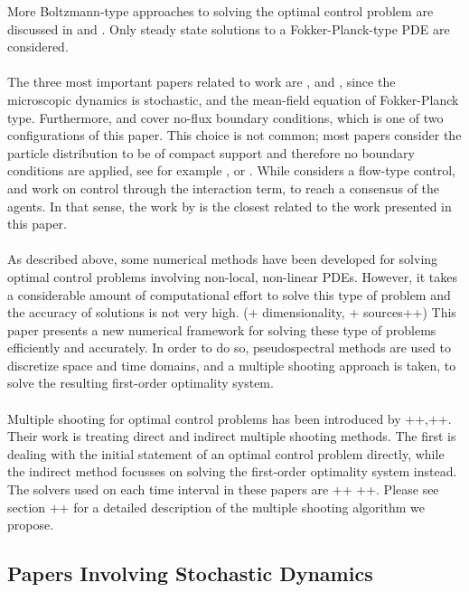 \documentclass[11pt, a4paper]{article}
\theoremstyle{definition}
\begin{document}
More Boltzmann-type approaches to solving the optimal control problem are discussed in \cite{Albi_2014no1} and \cite{albi2014kinetic}. Only steady state solutions to a Fokker-Planck-type PDE are considered.
\\
\\
The three most important papers related to work are \cite{albi2016mean},\cite{carrillo2018no1} and \cite{Pinnau_2017}, since the microscopic dynamics is stochastic, and the mean-field equation of Fokker-Planck type. Furthermore, \cite{albi2016mean} and \cite{carrillo2018no1} cover no-flux boundary conditions, which is one of two configurations of this paper. This choice is not common;  most papers consider the particle distribution to be of compact support and therefore no boundary conditions are applied, see for example \cite{burger2019meanfield}, \cite{fornasier_lisini_orrieri_savare_2019} or \cite{burger2016controlling}.
While \cite{albi2016mean} considers a flow-type control, \cite{carrillo2018no1} and \cite{Pinnau_2017} work on control through the interaction term, to reach a consensus of the agents.
In that sense, the work by \cite{albi2016mean} is the closest related to the work presented in this paper.
\\
\\
As described above, some numerical methods have been developed for solving optimal control problems involving non-local, non-linear PDEs. However, it takes a considerable amount of computational effort to solve this type of problem and the accuracy of solutions is not very high.   (+ dimensionality, + sources++)
This paper presents a new numerical framework for solving these type of problems efficiently and accurately. In order to do so, pseudospectral methods are used to discretize space and time domains, and a multiple shooting approach is taken, to solve the resulting first-order optimality system. 
\\
\\
Multiple shooting for optimal control problems has been introduced by ++,++. Their work is treating direct and indirect multiple shooting methods. The first is dealing with the initial statement of an optimal control problem directly, while the indirect method focusses on solving the first-order optimality system instead.
The solvers used on each time interval in these papers are ++ ++. Please see section ++ for a detailed description of the multiple shooting algorithm we propose.




\subsection*{Papers Involving Stochastic Dynamics}
\cite{albi2016mean} 
\end{document}
